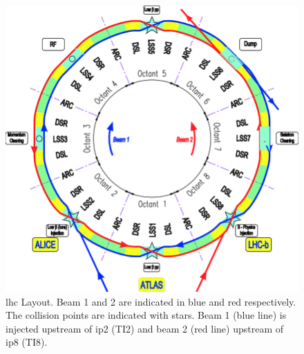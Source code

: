 \documentclass[encoding=utf8,british]{tumphthesis}
\begin{document}
\begin{minipage}[t]{0.50\linewidth}

\begin{figure}[H]
    \centering
    \includegraphics[width=1.0\linewidth]{figures/Layout-of-the-LHC-ring.png}
    \caption{\acrshort{lhc} Layout. Beam 1 and 2 are indicated in blue and red respectively. The collision points are indicated with stars. Beam 1 (blue line) is injected upstream of \acrshort{ip}2 (TI2) and beam 2 (red line) upstream of \acrshort{ip}8 (TI8).
    \cite{LHC-design-report}}
    \label{fig:lhc-layout}
\end{figure}

\end{minipage}
\end{document}
